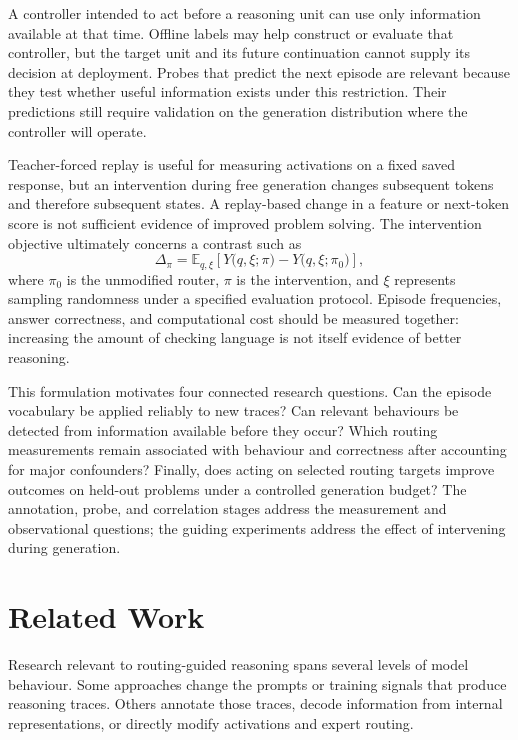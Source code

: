 \documentclass[12pt,a4paper,twoside,openright]{book}
\begin{document}
A controller intended to act before a reasoning unit can use only information
available at that time. Offline labels may help construct or evaluate that
controller, but the target unit and its future continuation cannot supply its
decision at deployment. Probes that predict the next episode are relevant
because they test whether useful information exists under this restriction.
Their predictions still require validation on the generation distribution
where the controller will operate.

Teacher-forced replay is useful for measuring activations on a fixed saved
response, but an intervention during free generation changes subsequent
tokens and therefore subsequent states. A replay-based change in a feature
or next-token score is not sufficient evidence of improved problem solving.
The intervention objective ultimately concerns a contrast such as
\begin{equation}
  \Delta_{\pi}=\mathbb{E}_{q,\xi}
  \left[Y\bigl(q,\xi;\pi\bigr)-Y\bigl(q,\xi;\pi_0\bigr)\right],
  \label{eq:policy-effect}
\end{equation}
where $\pi_0$ is the unmodified router, $\pi$ is the intervention, and $\xi$
represents sampling randomness under a specified evaluation protocol.
Episode frequencies, answer correctness, and computational cost should be
measured together: increasing the amount of checking language is not itself
evidence of better reasoning.

This formulation motivates four connected research questions. Can the episode
vocabulary be applied reliably to new traces? Can relevant behaviours be
detected from information available before they occur? Which routing
measurements remain associated with behaviour and correctness after accounting
for major confounders? Finally, does acting on selected routing targets improve
outcomes on held-out problems under a controlled generation budget? The
annotation, probe, and correlation stages address the measurement and
observational questions; the guiding experiments address the effect of
intervening during generation.

\chapter{Related Work}
\label{ch:related-work}

Research relevant to routing-guided reasoning spans several levels of model
behaviour. Some approaches change the prompts or training signals that
produce reasoning traces. Others annotate those traces, decode information
from internal representations, or directly modify activations and expert
routing.
\end{document}
